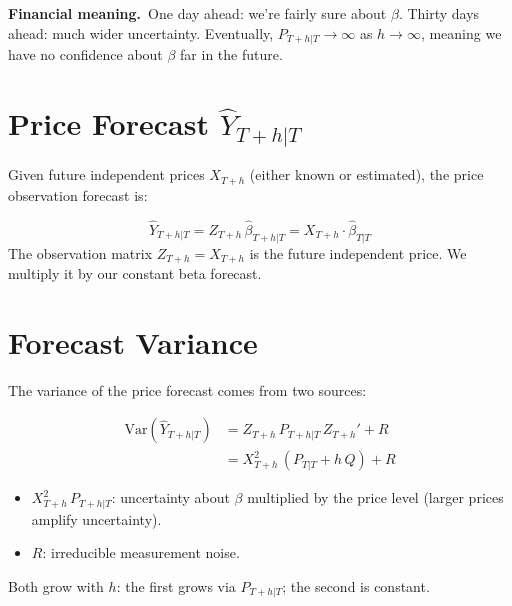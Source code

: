 \documentclass[10pt,a4paper,twocolumn]{article}
\begin{document}
\noindent\textbf{Financial meaning.}~One day ahead: we're fairly sure about $\beta$.
Thirty days ahead: much wider uncertainty. Eventually, $P_{T+h|T} \to \infty$
as $h \to \infty$, meaning we have no confidence about $\beta$ far in the
future.

\section{Price Forecast $\hat Y_{T+h|T}$}

Given future independent prices $X_{T+h}$ (either known or estimated),
the price observation forecast is:

\begin{tcolorbox}[mathbox={Formula 3 --- Price Observation Forecast}]
\vspace{-4pt}
\begin{equation}
  \hat{Y}_{T+h|T} = Z_{T+h}\,\hat\beta_{T+h|T} = X_{T+h}\cdot\hat\beta_{T|T}
  \label{eq:y_fc}
\end{equation}
\vspace{-4pt}
The observation matrix $Z_{T+h} = X_{T+h}$ is the future independent price.
We multiply it by our constant beta forecast.
\end{tcolorbox}

\section{Forecast Variance}

The variance of the price forecast comes from two sources:

\begin{tcolorbox}[mathbox={Formula 4 --- Observation Forecast Variance}]
\vspace{-4pt}
\begin{align}
  \mathrm{Var}(\hat{Y}_{T+h|T}) &= Z_{T+h}\,P_{T+h|T}\,Z_{T+h}' + R \nonumber\\
  &= X_{T+h}^2\,(P_{T|T} + h\,Q) + R
  \label{eq:y_var}
\end{align}
\vspace{-4pt}
\begin{itemize}\setlength\itemsep{0pt}
  \item $X_{T+h}^2\,P_{T+h|T}$: uncertainty about $\beta$ multiplied by
    the price level (larger prices amplify uncertainty).
  \item $R$: irreducible measurement noise.
\end{itemize}
Both grow with $h$: the first grows via $P_{T+h|T}$; the second is constant.
\end{tcolorbox}
\end{document}
